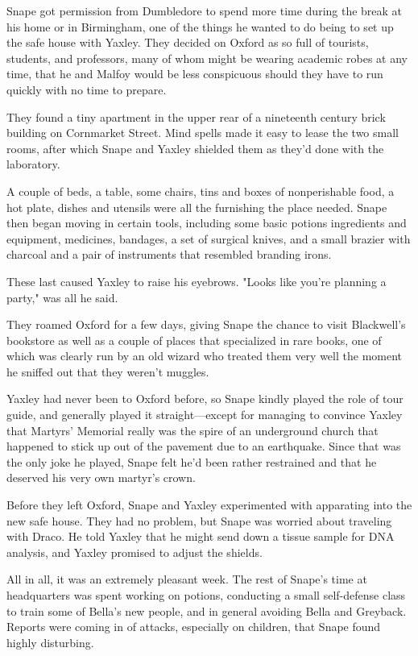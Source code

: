 Snape got permission from Dumbledore to spend more time during the break at his home or in Birmingham, one of the things he wanted to do being to set up the safe house with Yaxley. They decided on Oxford as so full of tourists, students, and professors, many of whom might be wearing academic robes at any time, that he and Malfoy would be less conspicuous should they have to run quickly with no time to prepare.

They found a tiny apartment in the upper rear of a nineteenth century brick building on Cornmarket Street. Mind spells made it easy to lease the two small rooms, after which Snape and Yaxley shielded them as they'd done with the laboratory.

A couple of beds, a table, some chairs, tins and boxes of nonperishable food, a hot plate, dishes and utensils were all the furnishing the place needed. Snape then began moving in certain tools, including some basic potions ingredients and equipment, medicines, bandages, a set of surgical knives, and a small brazier with charcoal and a pair of instruments that resembled branding irons.

These last caused Yaxley to raise his eyebrows. "Looks like you're planning a party," was all he said.

They roamed Oxford for a few days, giving Snape the chance to visit Blackwell's bookstore as well as a couple of places that specialized in rare books, one of which was clearly run by an old wizard who treated them very well the moment he sniffed out that they weren't muggles.

Yaxley had never been to Oxford before, so Snape kindly played the role of tour guide, and generally played it straight—except for managing to convince Yaxley that Martyrs' Memorial really was the spire of an underground church that happened to stick up out of the pavement due to an earthquake. Since that was the only joke he played, Snape felt he'd been rather restrained and that he deserved his very own martyr's crown.

Before they left Oxford, Snape and Yaxley experimented with apparating into the new safe house. They had no problem, but Snape was worried about traveling with Draco. He told Yaxley that he might send down a tissue sample for DNA analysis, and Yaxley promised to adjust the shields.

All in all, it was an extremely pleasant week. The rest of Snape's time at headquarters was spent working on potions, conducting a small self-defense class to train some of Bella's new people, and in general avoiding Bella and Greyback. Reports were coming in of attacks, especially on children, that Snape found highly disturbing.

